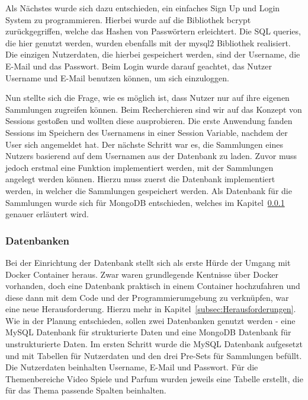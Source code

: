 % 

Als Nächstes wurde sich dazu entschieden, ein einfaches Sign Up und Login System zu programmieren.
Hierbei wurde auf die Bibliothek bcrypt zurückgegriffen, welche das Hashen von Passwörtern erleichtert.
Die SQL queries, die hier genutzt werden, wurden ebenfalls mit der mysql2 Bibliothek realisiert.
Die einzigen Nutzerdaten, die hierbei gespeichert werden, sind der Username, die E-Mail und das Passwort.
Beim Login wurde darauf geachtet, das Nutzer Username und E-Mail benutzen können, um sich einzuloggen.

Nun stellte sich die Frage, wie es möglich ist, dass Nutzer nur auf ihre eigenen Sammlungen zugreifen können.
Beim Recherchieren sind wir auf das Konzept von Sessions gestoßen und wollten diese ausprobieren.
Die erste Anwendung fanden Sessions im Speichern des Usernamens in einer Session Variable, nachdem der User sich angemeldet hat.
Der nächste Schritt war es, die Sammlungen eines Nutzers basierend auf dem Usernamen aus der Datenbank zu laden.
Zuvor muss jedoch erstmal eine Funktion implementiert werden, mit der Sammlungen angelegt werden können.
Hierzu muss zuerst die Datenbank implementiert werden, in welcher die Sammlungen gespeichert werden.
Als Datenbank für die Sammlungen wurde sich für MongoDB entschieden, welches im Kapitel~\ref{subsec:Datenbanken} genauer erläutert wird.

\subsubsection{Datenbanken}\label{subsec:Datenbanken}

Bei der Einrichtung der Datenbank stellt sich als erste Hürde der Umgang mit Docker Container heraus.
Zwar waren grundlegende Kentnisse über Docker vorhanden, doch eine Datenbank praktisch in einem Container hochzufahren und diese dann mit dem Code und der Programmierumgebung zu verknüpfen, war eine neue Herausforderung.
Hierzu mehr in Kapitel~\ref{subsec:Herausforderungen}.
Wie in der Planung entschieden, sollen zwei Datenbanken genutzt werden - eine MySQL Datenbank für strukturierte Daten und eine MongoDB Datenbank für unstrukturierte Daten.
Im ersten Schritt wurde die MySQL Datenbank aufgesetzt und mit Tabellen für Nutzerdaten und den drei Pre-Sets für Sammlungen befüllt.
Die Nutzerdaten beinhalten Username, E-Mail und Passwort.
Für die Themenbereiche Video Spiele und Parfum wurden jeweils eine Tabelle erstellt, die für das Thema passende Spalten beinhalten.

